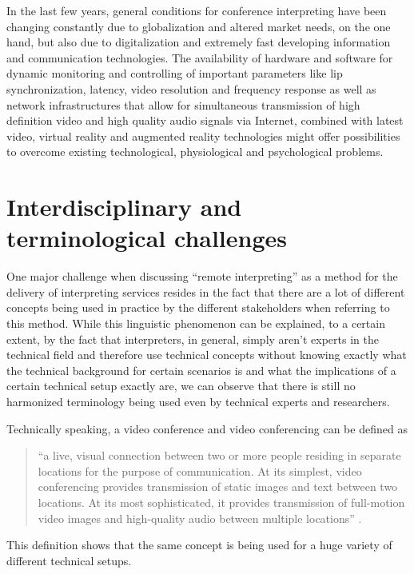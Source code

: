 \documentclass[output=paper]{langsci/langscibook}
\begin{document}
In the last few years, general conditions for conference interpreting have been changing constantly due to globalization and altered market needs, on the one hand, but also due to digitalization and extremely fast developing information and communication technologies. The availability of hardware and software for dynamic monitoring and controlling of important parameters like lip synchronization, latency, video resolution and frequency response as well as network infrastructures that allow for simultaneous transmission of high definition video and high quality audio signals via Internet, combined with latest video, virtual reality and augmented reality technologies might offer possibilities to overcome existing technological, physiological and psychological problems. 

\section{Interdisciplinary and terminological challenges}
\label{sec:ziegler:02}
One major challenge when discussing “remote interpreting” as a method for the delivery of interpreting services resides in the fact that there are a lot of different concepts being used in practice by the different stakeholders when referring to this method. While this linguistic phenomenon can be explained, to a certain extent, by the fact that interpreters, in general, simply aren’t experts in the technical field and therefore use technical concepts without knowing exactly what the technical background for certain scenarios is and what the implications of a certain technical setup exactly are, we can observe that there is still no harmonized terminology being used even by technical experts and researchers. 

Technically speaking, a video conference and video conferencing can be defined as 

\begin{quote}
	“a live, visual connection between two or more people residing in separate locations for the purpose of communication. At its simplest, video conferencing provides transmission of static images and text between two locations. At its most sophisticated, it provides transmission of full-motion video images and high-quality audio between multiple locations” \citep{TechTarget2017}.
\end{quote}

This definition shows that the same concept is being used for a huge variety of different technical setups.
\end{document}
